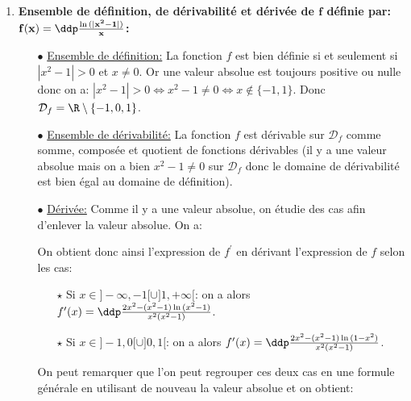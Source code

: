 \begin{correction}  \;
\begin{enumerate}
\item  \textbf{Ensemble de d\'efinition, de d\'erivabilit\'e et d\'eriv\'ee de $\mathbf{f}$ d\'efinie par: $\mathbf{f(x)=\ddp\frac{\ln{(|x^2-1|)}}{x}}$:}
\begin{itemize}
\item[$\bullet$] \underline{Ensemble de d\'efinition:} La fonction $f$ est bien d\'efinie si et seulement si $|x^2-1|>0$ et $x\not= 0$. Or une valeur absolue est toujours positive ou nulle donc on a: $|x^2-1|>0\Leftrightarrow x^2-1\not= 0 \Leftrightarrow x\notin \lbrace -1,1\rbrace$.  
Donc $\mathcal{D}_f=\R\setminus\lbrace -1,0,1\rbrace$.
\item[$\bullet$] \underline{Ensemble de d\'erivabilit\'e:} La fonction $f$ est d\'erivable sur $\mathcal{D}_f$ comme somme, compos\'ee et quotient de fonctions d\'erivables (il y a une valeur absolue mais on a bien $x^2-1\not= 0$ sur $\mathcal{D}_f$ donc le domaine de d\'erivabilit\'e est bien \'egal au domaine de d\'efinition).
\item[$\bullet$] \underline{D\'eriv\'ee:} Comme il y a une valeur absolue, on \'etudie des cas afin d'enlever la valeur absolue. 
On a:
\begin{center}
\end{center}
On obtient donc ainsi l'expression de $f^{\prime}$ en d\'erivant l'expression de $f$ selon les cas:
\begin{itemize}
\item[$\star$] Si $x\in\rbrack -\infty,-1\lbrack\cup\rbrack 1,+\infty\lbrack$: on a alors $f^{\prime}(x)=\ddp\frac{2x^2-(x^2-1)\ln{(x^2-1)}}{x^2(x^2-1)}$.
\item[$\star$] Si $x\in\rbrack -1,0\lbrack\cup\rbrack 0,1\lbrack$: on a alors $f^{\prime}(x)=\ddp\frac{2x^2-(x^2-1)\ln{(1-x^2)}}{x^2(x^2-1)}$.
\end{itemize}
On peut remarquer que l'on peut regrouper ces deux cas en une formule g\'en\'erale en utilisant de nouveau la valeur absolue et on obtient: 

\end{itemize}
\end{enumerate}
\end{correction}
